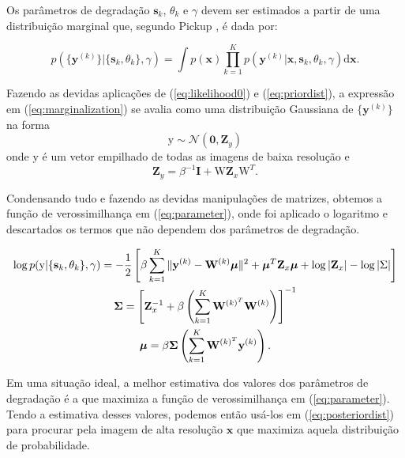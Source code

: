 Os parâmetros de degradação $\mathbf{s}_k$, $\theta_k$ e $\gamma$ devem ser estimados a partir de uma distribuição marginal que, segundo Pickup \cite{pickup2007bayesian2}, é dada por:

\begin{equation}
	\label{eq:marginalization}
	p(\{\mathbf{y}^{(k)}\} | \{\mathbf{s}_k, \theta_k \}, \gamma) = 
	\int  p(\mathbf{x})\prod^K_{k=1} p(\mathbf{y}^{(k)}|\mathbf{x},\mathbf{s}_k,\theta_k, \gamma) \mathrm{d}\mathbf{x}.
\end{equation}

Fazendo as devidas aplicações de (\ref{eq:likelihood0}) e (\ref{eq:priordist}), a expressão em (\ref{eq:marginalization}) se avalia como uma distribuição Gaussiana de $\{\mathbf{y}^{(k)}\}$ na forma
\begin{equation}
	\mathrm{y} \sim \mathcal{N}(\mathbf{0}, \mathbf{Z}_y)
\end{equation}
onde $\mathrm{y}$ é um vetor empilhado de todas as imagens de baixa resolução e
\begin{equation}
	\mathbf{Z}_y = \beta^{-1} \mathbf{I} + \mathrm{W} \mathbf{Z}_x \mathrm{W}^T.
\end{equation}


Condensando tudo e fazendo as devidas manipulações de matrizes, obtemos a função de verossimilhança em (\ref{eq:parameter}), onde foi aplicado o logaritmo e descartados os termos que não dependem dos parâmetros de degradação.

\begin{gather}
	\label{eq:parameter}
	\log p(\mathrm{y}|\{\mathbf{s}_k,\theta_k\}, \gamma) = -\frac{1}{2}\left[\beta \sum^K_{k=1} \|\mathbf{y}^{(k)} - \mathbf{W}^{(k)}\boldsymbol{\mu}\|^2
    + \boldsymbol{\mu}^T\mathbf{Z}_x \boldsymbol{\mu}
    \vphantom{\int_t} + \log |\mathbf{Z}_x| - \log{|\Sigma |} \right] \\
	\mathbf{ \Sigma }= \left[\mathbf{Z}^{-1}_x + \beta \left( \sum^K_{k = 1} \mathbf{W}^{(k)^T} \mathbf{W}^{(k)} \right) \right]^{-1} \\
	\boldsymbol{\mu} = \beta \mathbf{ \Sigma } \left( \sum^K_{k=1} \mathbf{W}^{(k)^T}\mathbf{y}^{(k)} \right).
\end{gather}

Em uma situação ideal, a melhor estimativa dos valores dos parâmetros de degradação é a que maximiza a função de verossimilhança em (\ref{eq:parameter}).
Tendo a estimativa desses valores, podemos então usá-los em (\ref{eq:posteriordist}) para procurar pela imagem de alta resolução $\mathbf{x}$ que maximiza aquela distribuição de probabilidade.

